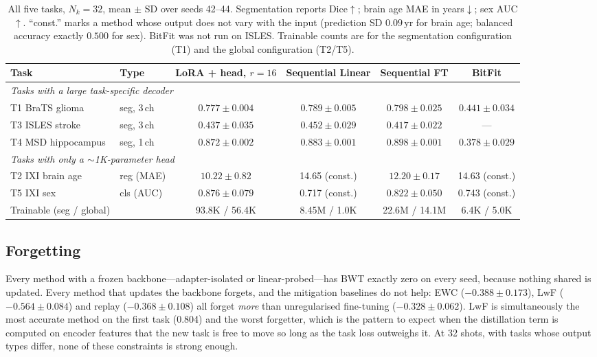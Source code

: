 \documentclass[journal,twoside,web]{ieeecolor}
\begin{document}
\begin{table}[t]
\caption{All five tasks, $N_k=32$, mean $\pm$ SD over seeds 42--44. Segmentation reports Dice$\uparrow$; brain age MAE in years$\downarrow$; sex AUC$\uparrow$. ``const.'' marks a method whose output does not vary with the input (prediction SD $0.09$\,yr for brain age; balanced accuracy exactly $0.500$ for sex). BitFit was not run on ISLES. Trainable counts are for the segmentation configuration (T1) and the global configuration (T2/T5).}
\label{tab:five}
\centering
\footnotesize
\setlength{\tabcolsep}{4pt}
\begin{tabular}{llcccc}
\toprule
Task & Type & LoRA + head, $r{=}16$ & Sequential Linear & Sequential FT & BitFit \\
\midrule
\multicolumn{6}{l}{\emph{Tasks with a large task-specific decoder}} \\
T1 BraTS glioma      & seg, 3\,ch & $0.777\pm0.004$ & $\mathbf{0.789\pm0.005}$ & $0.798\pm0.025$ & $0.441\pm0.034$ \\
T3 ISLES stroke      & seg, 3\,ch & $0.437\pm0.035$ & $\mathbf{0.452\pm0.029}$ & $0.417\pm0.022$ & --- \\
T4 MSD hippocampus   & seg, 1\,ch & $0.872\pm0.002$ & $\mathbf{0.883\pm0.001}$ & $0.898\pm0.001$ & $0.378\pm0.029$ \\
\midrule
\multicolumn{6}{l}{\emph{Tasks with only a $\sim$1K-parameter head}} \\
T2 IXI brain age     & reg (MAE) & $\mathbf{10.22\pm0.82}$ & 14.65 (const.) & $12.20\pm0.17$ & 14.63 (const.) \\
T5 IXI sex           & cls (AUC) & $\mathbf{0.876\pm0.079}$ & 0.717 (const.) & $0.822\pm0.050$ & 0.743 (const.) \\
\midrule
Trainable (seg / global) & & 93.8K / 56.4K & 8.45M / 1.0K & 22.6M / 14.1M & 6.4K / 5.0K \\
\bottomrule
\end{tabular}
\end{table}

\subsection{Forgetting}
\label{sec:res_forgetting}

Every method with a frozen backbone---adapter-isolated or linear-probed---has BWT exactly zero on every seed, because nothing shared is updated. Every method that updates the backbone forgets, and the mitigation baselines do not help: EWC ($-0.388\pm0.173$), LwF ($-0.564\pm0.084$) and replay ($-0.368\pm0.108$) all forget \emph{more} than unregularised fine-tuning ($-0.328\pm0.062$). LwF is simultaneously the most accurate method on the first task (0.804) and the worst forgetter, which is the pattern to expect when the distillation term is computed on encoder features that the new task is free to move so long as the task loss outweighs it. At 32 shots, with tasks whose output types differ, none of these constraints is strong enough.
\end{document}
